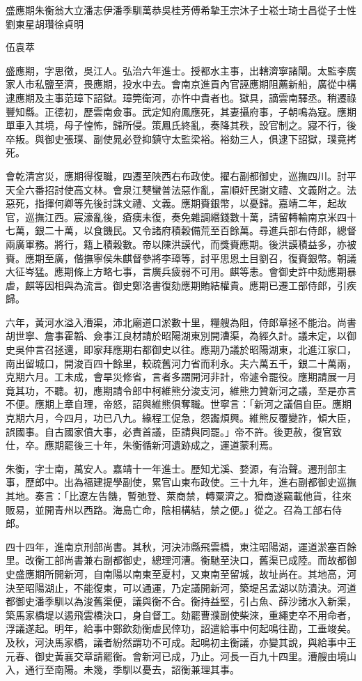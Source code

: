 
\begin{pinyinscope}
盛應期朱衡翁大立潘志伊潘季馴萬恭吳桂芳傅希摯王宗沐子士崧士琦士昌從子士性劉東星胡瓚徐貞明{{伍袁萃

盛應期，字思徵，吳江人。弘治六年進士。授都水主事，出轄濟寧諸閘。太監李廣家人市私鹽至濟，畏應期，投水中去。會南京進貢內官誣應期阻薦新船，廣從中構逮應期及主事范璋下詔獄。璋筦衛河，亦忤中貴者也。獄具，謫雲南驛丞。稍遷祿豐知縣。正德初，歷雲南僉事。武定知府鳳應死，其妻攝府事，子朝鳴為寇。應期單車入其境，母子惶怖，歸所侵。策鳳氏終亂，奏降其秩，設官制之。寢不行，後卒叛。與御史張璞、副使晁必登抑鎮守太監梁裕。裕劾三人，俱逮下詔獄，璞竟拷死。

會乾清宮災，應期得復職，四遷至陜西右布政使。擢右副都御史，巡撫四川。討平天全六番招討使高文林。會泉江僰蠻普法惡作亂，富順奸民謝文禮、文義附之。法惡死，指揮何卿等先後討誅文禮、文義。應期賚銀幣，以憂歸。嘉靖二年，起故官，巡撫江西。宸濠亂後，瘡痍未復，奏免雜調緡錢數十萬，請留轉輸南京米四十七萬，銀二十萬，以食饑民。又令諸府積穀備荒至百餘萬。尋進兵部右侍郎，總督兩廣軍務。將行，籍上積穀數。帝以陳洪謨代，而獎賚應期。後洪謨積益多，亦被賚。應期至廣，偕撫寧侯朱麒督參將李璋等，討平思恩土目劉召，復賚銀幣。朝議大征岑猛。應期條上方略七事，言廣兵疲弱不可用。麒等恚。會御史許中劾應期暴虐，麒等因相與為流言。御史鄭洛書復劾應期賄結權貴。應期已遷工部侍郎，引疾歸。

六年，黃河水溢入漕渠，沛北廟道口淤數十里，糧艘為阻，侍郎章拯不能治。尚書胡世寧、詹事霍韜、僉事江良材請於昭陽湖東別開漕渠，為經久計。議未定，以御史吳仲言召拯還，即家拜應期右都御史以往。應期乃議於昭陽湖東，北進江家口，南出留城口，開浚百四十餘里，較疏舊河力省而利永。夫六萬五千，銀二十萬兩，克期六月。工未成，會旱災修省，言者多謂開河非計，帝遽令罷役。應期請展一月竟其功，不聽。初，應期請令郎中柯維熊分浚支河，維熊力贊新河之議，至是亦言不便。應期上章自理，帝怒，詔與維熊俱奪職。世寧言：「新河之議倡自臣。應期克期六月，今四月，功已八九。緣程工促急，怨讟煩興。維熊反覆變詐，傾大臣，誤國事。自古國家僨大事，必責首議，臣請與同罷。」帝不許。後更赦，復官致仕，卒。應期罷後三十年，朱衡循新河遺跡成之，運道蒙利焉。

朱衡，字士南，萬安人。嘉靖十一年進士。歷知尤溪、婺源，有治聲。遷刑部主事，歷郎中。出為福建提學副使，累官山東布政使。三十九年，進右副都御史巡撫其地。奏言：「比遼左告饑，暫弛登、萊商禁，轉粟濟之。猾商遂竊載他貨，往來販易，並開青州以西路。海島亡命，陰相構結，禁之便。」從之。召為工部右侍郎。

四十四年，進南京刑部尚書。其秋，河決沛縣飛雲橋，東注昭陽湖，運道淤塞百餘里。改衡工部尚書兼右副都御史，總理河漕。衡馳至決口，舊渠已成陸。而故都御史盛應期所開新河，自南陽以南東至夏村，又東南至留城，故址尚在。其地高，河決至昭陽湖止，不能復東，可以通運，乃定議開新河，築堤呂孟湖以防潰決。河道都御史潘季馴以為浚舊渠便，議與衡不合。衡持益堅，引占魚、薛沙諸水入新渠，築馬家橋堤以遏飛雲橋決口，身自督工。劾罷曹濮副使柴淶，重繩吏卒不用命者，浮議遂起。明年，給事中鄭欽劾衡虐民倖功，詔遣給事中何起鳴往勘，工垂竣矣。及秋，河決馬家橋，議者紛然謂功不可成。起鳴初主衡議，亦變其說，與給事中王元春、御史黃襄交章請罷衡。會新河已成，乃止。河長一百九十四里。漕艘由境山入，通行至南陽。未幾，季馴以憂去，詔衡兼理其事。

}}
\end{pinyinscope}

